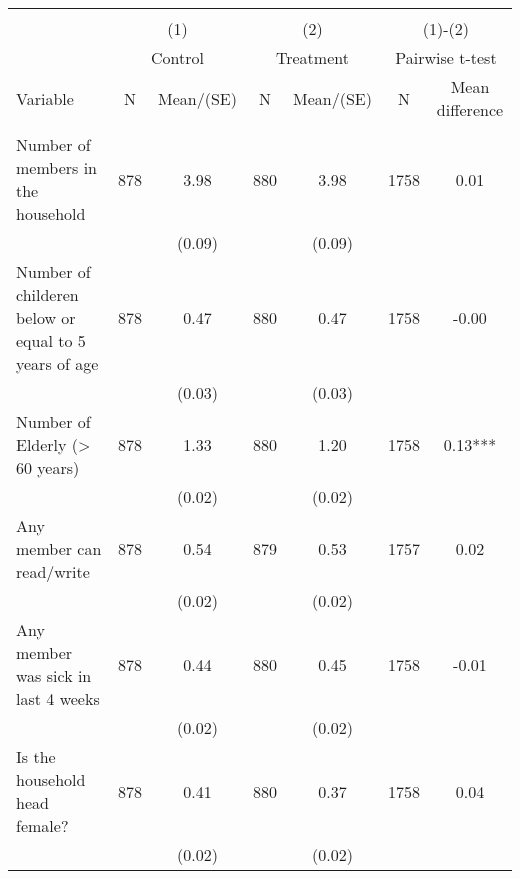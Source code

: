 
\begin{tabular}{@{\extracolsep{5pt}}lcccccc}
\\[-1.8ex]\hline \hline \\[-1.8ex]
 & \multicolumn{2}{c}{(1)}  & \multicolumn{2}{c}{(2)}  & \multicolumn{2}{c}{(1)-(2)} \\
 & \multicolumn{2}{c}{Control}  & \multicolumn{2}{c}{Treatment}  & \multicolumn{2}{c}{Pairwise t-test}  \\
Variable & N & Mean/(SE) & N & Mean/(SE) & N & Mean difference \\ \hline \\[-1.8ex] 
Number of members in the household   & 878    & 3.98    & 880    & 3.98    & 1758    & 0.01   \\
 &   & (0.09)  &   & (0.09)  &   &  \\ [1ex]
Number of childeren below or equal to 5 years of age   & 878    & 0.47    & 880    & 0.47    & 1758    & -0.00   \\
 &   & (0.03)  &   & (0.03)  &   &  \\ [1ex]
Number of Elderly (> 60 years)   & 878    & 1.33    & 880    & 1.20    & 1758    & 0.13***   \\
 &   & (0.02)  &   & (0.02)  &   &  \\ [1ex]
Any member can read/write   & 878    & 0.54    & 879    & 0.53    & 1757    & 0.02   \\
 &   & (0.02)  &   & (0.02)  &   &  \\ [1ex]
Any member was sick in last 4 weeks   & 878    & 0.44    & 880    & 0.45    & 1758    & -0.01   \\
 &   & (0.02)  &   & (0.02)  &   &  \\ [1ex]
Is the household head female?   & 878    & 0.41    & 880    & 0.37    & 1758    & 0.04   \\
 &   & (0.02)  &   & (0.02)  &   &  \\ [1ex]

\end{tabular}
